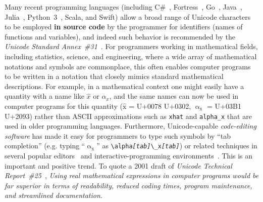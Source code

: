 \documentclass[10pt,english]{article}
\begin{document}
Many recent programming languages (including C\#~\cite{Csharp}, Fortress~\cite{Fortress},
Go~\cite{Go}, Java~\cite{Java}, Julia~\cite{Julia}, Python~3~\cite{Python}, Scala\cite{Scala}, and Swift\cite{Swift}) allow
a broad range of Unicode characters to be employed \textbf{in source code} by the programmer
for identifiers (names of functions and variables), and indeed such
behavior is recommended by the \emph{Unicode Standard Annex~\#31}~\cite{UAX31}.
For programmers working in mathematical fields, including statistics,
science, and engineering, where a wide array of mathematical notations
and symbols are commonplace, this often enables computer programs
to be written in a notation that closely mimics standard mathematical
descriptions. For example, in a mathematical context one might easily
have a quantity with a name like $\hat{x}$ or $\alpha_{x}$, and
the same names can now be used in computer programs for this quantity
($\mathrm{\hat{{x}}}$ = U+0078 U+0302, $\mathrm{{\upalpha_{x}}}$
= U+03B1 U+2093) rather than ASCII approximations such as \texttt{xhat}
and \texttt{alpha\_x} that are used in older programming languages.
Furthermore, Unicode-capable \emph{code-editing software} has made it easy
for programmers to type such symbols by ``tab completion''
(e.g. typing ``$\mathrm{{\upalpha_{x}}}$''
as \texttt{\textbackslash{}alpha}\texttt{\emph{{[}tab{]}}}\texttt{\textbackslash{}\_x}\texttt{\emph{{[}tab{]}}})
or related techniques in several popular editors~\cite{vsCode,Atom,Emacs,Sublime,Vim}
and interactive-programming environments~\cite{Julia,IPython}. This
is an important and positive trend. To quote a 2001 draft of \emph{Unicode
Technical Report~\#25}~\cite[section 5.3]{UTR25}, \emph{Using real
mathematical expressions in computer programs would be far superior
in terms of readability, reduced coding times, program maintenance,
and streamlined documentation.}
\end{document}
